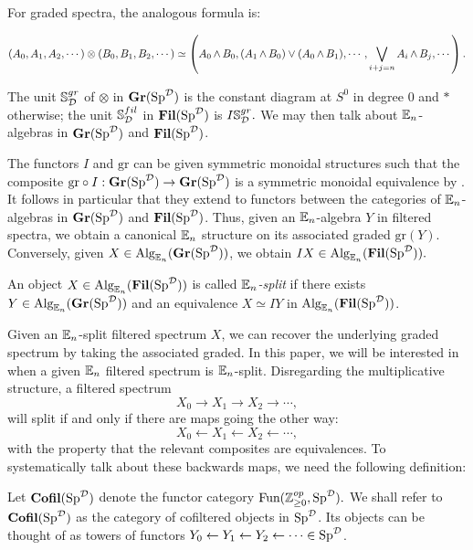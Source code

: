 For graded spectra, the analogous formula is:

$$(A_0,A_1,A_2,\cdots) \otimes (B_0,B_1,B_2,\cdots) \simeq \left( A_0 \smsh B_0, (A_1 \smsh B_0) \vee (A_0 \smsh B_1), \cdots, \bigvee_{i+j=n} A_i \smsh B_j, \cdots \right).$$


The unit $\mathbb{S}^{gr}_{\D}$ of $\otimes$ in $\Gr(\Sp^{\D})$ is the constant diagram at $S^0$ in degree 0 and $*$ otherwise; the unit $\mathbb{S}^{fil}_{\D}$ in $\Fil(\Sp^{\D})$ is $I\mathbb{S}^{gr}_{\D}.$  We may then talk about $\E_n$-algebras in $\Gr(\Sp^{\D})$ and $\Fil(\Sp^{\D})$.  


The functors $I$ and $\text{gr}$ can be given symmetric monoidal structures such that the composite $\text{gr}\circ I : \Gr(\Sp^{\D}) \to \Gr(\Sp^{\D})$ is a symmetric monoidal equivalence by \cite[Proposition 3.2.1]{LurieRot}.  It follows in particular that they extend to functors between the categories of $\E_n$-algebras in $\Gr(\Sp^{\D})$ and $\Fil(\Sp^{\D})$.  Thus, given an $\E_n$-algebra $Y$ in filtered spectra, we obtain a canonical $\E_n$ structure on its associated graded $\text{gr}(Y).$  Conversely, given $X\in \Alg_{\E_n}(\Gr(\Sp^{\D}))$, we obtain $IX\in \Alg_{\E_n}(\Fil(\Sp^{\D})).$  

\begin{dfn}
An object $X\in \Alg_{\E_n}(\Fil(\Sp^{\D}))$ is called \emph{$\E_n$-split} if there exists $Y\in \Alg_{\E_n}(\Gr(\Sp^{\D}))$ and an equivalence $X \simeq IY$ in $\Alg_{\E_n}(\Fil(\Sp^{\D}))$.  
\end{dfn}

Given an $\E_n$-split filtered spectrum $X$, we can recover the underlying graded spectrum by taking the associated graded.  In this paper, we will be interested in when a given $\E_n$ filtered spectrum is $\E_n$-split.  Disregarding the multiplicative structure, a filtered spectrum $$X_0\longrightarrow X_1 \longrightarrow X_2 \longrightarrow \cdots ,$$ will split if and only if there are maps going the other way: $$X_0 \longleftarrow X_1 \longleftarrow X_2 \longleftarrow \cdots,$$ with the property that the relevant composites are equivalences.   To systematically talk about these backwards maps, we need the following definition:

\begin{dfn} Let $\Cofil(\Sp^{\D})$ denote the functor category $\Fun(\Z_{\geq 0}^{op}, \Sp^{\D}).$  We shall refer to $\Cofil(\Sp^{\D})$ as the category of cofiltered objects in $\Sp^{\D}$.  Its objects can be thought of as towers of functors $Y_0\leftarrow Y_1\leftarrow Y_2 \leftarrow \cdots \in \Sp^{\D}$.
\end{dfn}

